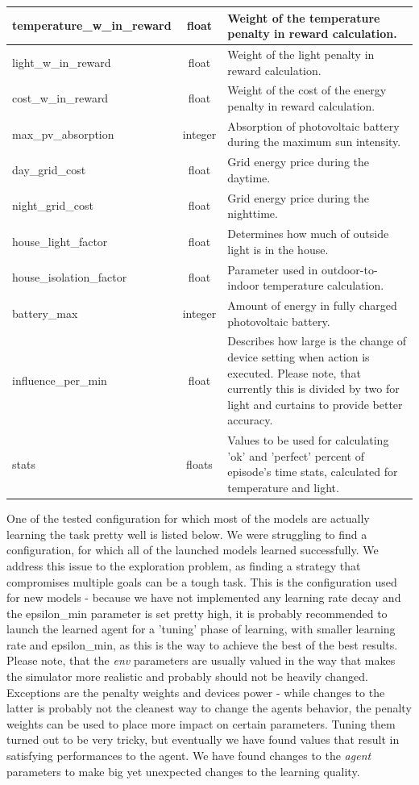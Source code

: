 \documentclass{article}
\begin{document}
{\begin{longtable}{l|c|p{9cm}}
    \hline
    temperature\_w\_in\_reward & float & Weight of the temperature penalty in reward calculation.\\
    \hline
    light\_w\_in\_reward & float & Weight of the light penalty in reward calculation.\\
    \hline
    cost\_w\_in\_reward & float & Weight of the cost of the energy penalty in reward calculation.\\
    \hline
    max\_pv\_absorption & integer & Absorption of photovoltaic battery during the maximum sun intensity.\\
    \hline
    day\_grid\_cost & float & Grid energy price during the daytime.\\
    \hline
    night\_grid\_cost & float & Grid energy price during the nighttime.\\
    \hline
    house\_light\_factor & float & Determines how much of outside light is in the house.\\
    \hline
    house\_isolation\_factor & float & Parameter used in outdoor-to-indoor temperature calculation.\\
    \hline
    battery\_max & integer & Amount of energy in fully charged photovoltaic battery.\\
    \hline
    influence\_per\_min & float & Describes how large is the change of device setting when action is executed. Please note, that currently this is divided by two for light and curtains to provide better accuracy.\\
    \hline
    stats & floats & Values to be used for calculating 'ok' and 'perfect' percent of episode's time stats, calculated for temperature and light. 
\end{longtable}}

One of the tested configuration for which most of the models are actually learning the task pretty well is listed below. We were struggling to find a configuration, for which all of the launched models learned successfully. We address this issue to the exploration problem, as finding a strategy that compromises multiple goals can be a tough task. This is the configuration used for new models - because we have not implemented any learning rate decay and the epsilon\_min parameter is set pretty high, it is probably recommended to launch the learned agent for a 'tuning' phase of learning, with smaller learning rate and epsilon\_min, as this is the way to achieve the best of the best results. Please note, that the \textit{env} parameters are usually valued in the way that makes the simulator more realistic and probably should not be heavily changed. Exceptions are the penalty weights and devices power - while changes to the latter is probably not the cleanest way to change the agents behavior, the penalty weights can be used to place more impact on certain parameters. Tuning them turned out to be very tricky, but eventually we have found values that result in satisfying performances to the agent. We have found changes to the \textit{agent} parameters to make big yet unexpected changes to the learning quality. 
\end{document}
